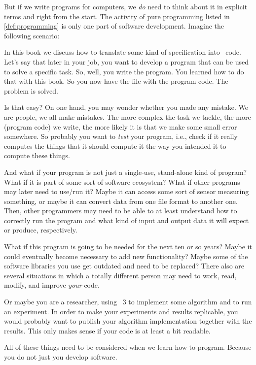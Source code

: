 But if we write programs for computers, we \emph{do} need to think about it in explicit terms and right from the start.
The activity of pure programming listed in \cref{def:programming} is only one part of software development.
Imagine the following scenario:

In this book we discuss how to translate some kind of specification into \python\ code.
Let's say that later in your job, you want to develop a program that can be used to solve a specific task.
So, well, you write the program.
You learned how to do that with this book.
So you now have the file with the program code.
The problem is solved.

Is that easy?
On one hand, you may wonder whether you made any mistake.
We are people, we all make mistakes.
The more complex the task we tackle, the more (program code) we write, the more likely it is that we make some small error somewhere.
So probably you want to \emph{test} your program, i.e., check if it really computes the things that it should compute it the way you intended it to compute these things.

And what if your program is not just a single-use, stand-alone kind of program?
What if it is part of some sort of software ecosystem?
What if other programs may later need to use/run it?
Maybe it can access some sort of sensor measuring something, or maybe it can convert data from one file format to another one.
Then, other programmers may need to be able to at least understand how to correctly run the program and what kind of input and output data it will expect or produce, respectively.

What if this program is going to be needed for the next ten or so years?
Maybe it could eventually become necessary to add new functionality?
Maybe some of the software libraries you use get outdated and need to be replaced?
There also are several situations in which a totally different person may need to work, read, modify, and improve \emph{your} code.

Or maybe you are a researcher, using \python~3 to implement some algorithm and to run an experiment.
In order to make your experiments and results replicable, you would probably want to publish your algorithm implementation together with the results.
This only makes sense if your code is at least a bit readable.

All of these things need to be considered when we learn how to program.
Because you do not just  you develop software.

